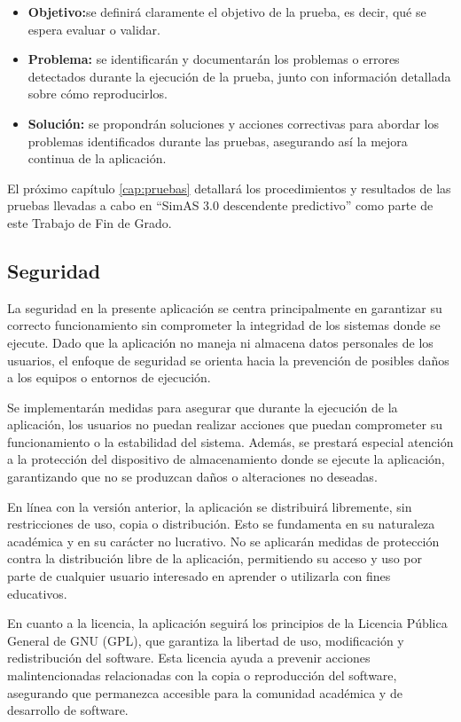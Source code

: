 \begin{itemize}
    \item \textbf{Objetivo:}se definirá claramente el objetivo de la prueba, es decir, qué se espera evaluar o validar.
    
    \item \textbf{Problema:} se identificarán y documentarán los problemas o errores detectados durante la ejecución de la prueba, junto con información detallada sobre cómo reproducirlos.

    \item \textbf{Solución:} se propondrán soluciones y acciones correctivas para abordar los problemas identificados durante las pruebas, asegurando así la mejora continua de la aplicación.
\end{itemize}

El próximo capítulo \ref{cap:pruebas} detallará los procedimientos y resultados de las pruebas llevadas a cabo en ``SimAS 3.0 descendente predictivo'' como parte de este Trabajo de Fin de Grado.


\subsection{Seguridad}
La seguridad en la presente aplicación se centra principalmente en garantizar su correcto funcionamiento sin comprometer la integridad de los sistemas donde se ejecute. Dado que la aplicación no maneja ni almacena datos personales de los usuarios, el enfoque de seguridad se orienta hacia la prevención de posibles daños a los equipos o entornos de ejecución.

Se implementarán medidas para asegurar que durante la ejecución de la aplicación, los usuarios no puedan realizar acciones que puedan comprometer su funcionamiento o la estabilidad del sistema. Además, se prestará especial atención a la protección del dispositivo de almacenamiento donde se ejecute la aplicación, garantizando que no se produzcan daños o alteraciones no deseadas.

En línea con la versión anterior, la aplicación se distribuirá libremente, sin restricciones de uso, copia o distribución. Esto se fundamenta en su naturaleza académica y en su carácter no lucrativo. No se aplicarán medidas de protección contra la distribución libre de la aplicación, permitiendo su acceso y uso por parte de cualquier usuario interesado en aprender o utilizarla con fines educativos.

En cuanto a la licencia, la aplicación seguirá los principios de la Licencia Pública General de GNU (GPL), que garantiza la libertad de uso, modificación y redistribución del software. Esta licencia ayuda a prevenir acciones malintencionadas relacionadas con la copia o reproducción del software, asegurando que permanezca accesible para la comunidad académica y de desarrollo de software.
